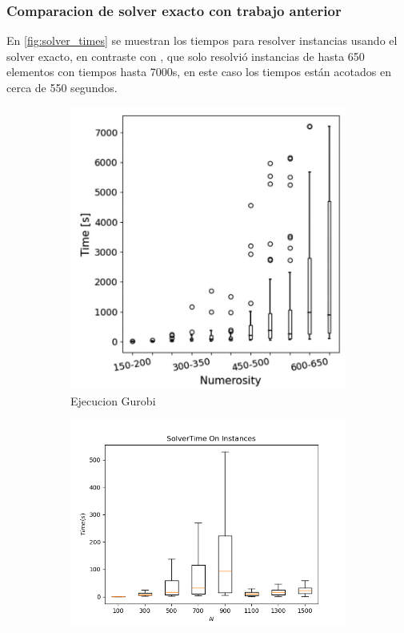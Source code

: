 \documentclass[spanish, a4paper, 12pt, openany,final]{book}
\begin{document}
\subsubsection*{Comparacion de solver exacto con trabajo anterior}
En \ref{fig:solver_times} se muestran los tiempos para resolver instancias usando el solver exacto, en contraste con \cite{baldo_polynomial_2023}, que solo resolvió instancias de hasta 650 elementos con tiempos hasta 7000s, en este caso los tiempos están acotados en cerca de 550 segundos.

\begin{figure}[h]
	\centering
	\begin{subfigure}{.5\textwidth}
		\includegraphics[width=1\linewidth]{graphs/baldo_solver_times.png}
		\caption{Ejecucion Gurobi \cite{baldo_polynomial_2023}}
	\end{subfigure}%
	\begin{subfigure}{.5\textwidth}
		\includegraphics[scale=0.656]{graphs/solver_times.png}

\end{subfigure}
\end{figure}
\end{document}
